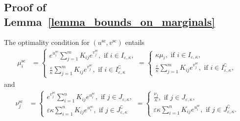 \subsection{Proof of Lemma~\ref{lemma_bounds_on_marginals}}

The optimality condition for $({u}^{\text{sc}}, {v}^{\text{sc}})$ entails 
\begin{align}
\label{i-th-marginal-mu} 
{\mu}^{\text{sc}}_i  &= 
\begin{cases}
e^{u^{\text{sc}}_i} \sum_{j=1}^m K_{ij} e^{v^{\text{sc}}_j}, \text{ if  }i \in I_{\varepsilon,\kappa},\\
\frac \varepsilon\kappa\sum_{j=1}^m K_{ij} e^{v^{\text{sc}}_j}, \text{ if  }i \in I^\complement_{\varepsilon,\kappa}
\end{cases}
=\begin{cases}
\kappa \mu_i, \text{ if  }i \in I_{\varepsilon,\kappa},\\
\frac \varepsilon\kappa\sum_{j=1}^m K_{ij} e^{v^{\text{sc}}_j}, \text{ if  }i \in I^\complement_{\varepsilon,\kappa},
\end{cases}
\end{align}
and 
\begin{align}
\label{i-th-marginal-nu} 
{\nu}^{\text{sc}}_j  &= 
\begin{cases}
e^{v^{\text{sc}}_j} \sum_{i=1}^n K_{ij} e^{u^{\text{sc}}_i}, \text{ if  }j \in J_{\varepsilon,\kappa},\\
\varepsilon\kappa\sum_{i=1}^n K_{ij} e^{u^{\text{sc}}_i}, \text{ if  }j \in J^\complement_{\varepsilon,\kappa}
\end{cases}
=\begin{cases}
\frac{\nu_j}{\kappa}, \text{ if  }j \in J_{\varepsilon,\kappa},\\
\varepsilon\kappa\sum_{i=1}^n K_{ij} e^{u^{\text{sc}}_i}, \text{ if  }j \in J^\complement_{\varepsilon,\kappa}.
\end{cases}
\end{align}

